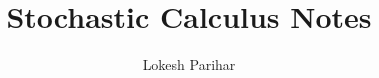 \documentclass{article}
\title{Stochastic Calculus Notes}
\author{Lokesh Parihar}
\date{}
\begin{document}
\maketitle{}


\tableofcontents %

\newpage








\end{document}
